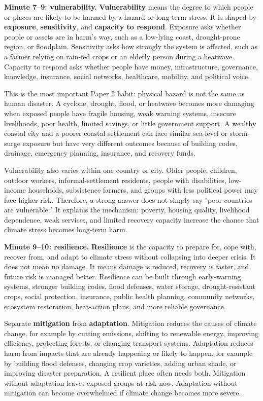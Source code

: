 \documentclass[11pt,a4paper]{article}
\newcommand{\term}[1]{\textcolor{HeadingBlue}{\textbf{#1}}}
\begin{document}
\textbf{Minute 7--9: vulnerability.}
\term{Vulnerability} means the degree to which people or places are likely to be
harmed by a hazard or long-term stress. It is shaped by \term{exposure},
\term{sensitivity}, and \term{capacity to respond}. Exposure asks whether people
or assets are in harm's way, such as a low-lying coast, drought-prone region, or
floodplain. Sensitivity asks how strongly the system is affected, such as a
farmer relying on rain-fed crops or an elderly person during a heatwave.
Capacity to respond asks whether people have money, infrastructure, governance,
knowledge, insurance, social networks, healthcare, mobility, and political voice.

This is the most important Paper 2 habit: physical hazard is not the same as
human disaster. A cyclone, drought, flood, or heatwave becomes more damaging
when exposed people have fragile housing, weak warning systems, insecure
livelihoods, poor health, limited savings, or little government support. A
wealthy coastal city and a poorer coastal settlement can face similar sea-level
or storm-surge exposure but have very different outcomes because of building
codes, drainage, emergency planning, insurance, and recovery funds.

Vulnerability also varies within one country or city. Older people, children,
outdoor workers, informal-settlement residents, people with disabilities,
low-income households, subsistence farmers, and groups with less political power
may face higher risk. Therefore, a strong answer does not simply say "poor
countries are vulnerable." It explains the mechanism: poverty, housing quality,
livelihood dependence, weak services, and limited recovery capacity increase the
chance that climate stress becomes long-term harm.

\textbf{Minute 9--10: resilience.}
\term{Resilience} is the capacity to prepare for, cope with, recover from, and
adapt to climate stress without collapsing into deeper crisis. It does not mean
no damage. It means damage is reduced, recovery is faster, and future risk is
managed better. Resilience can be built through early-warning systems, stronger
building codes, flood defenses, water storage, drought-resistant crops, social
protection, insurance, public health planning, community networks, ecosystem
restoration, heat-action plans, and more reliable governance.

Separate \term{mitigation} from \term{adaptation}. Mitigation reduces the causes
of climate change, for example by cutting emissions, shifting to renewable
energy, improving efficiency, protecting forests, or changing transport systems.
Adaptation reduces harm from impacts that are already happening or likely to
happen, for example by building flood defenses, changing crop varieties, adding
urban shade, or improving disaster preparation. A resilient place often needs
both. Mitigation without adaptation leaves exposed groups at risk now.
Adaptation without mitigation can become overwhelmed if climate change becomes
more severe.
\end{document}

